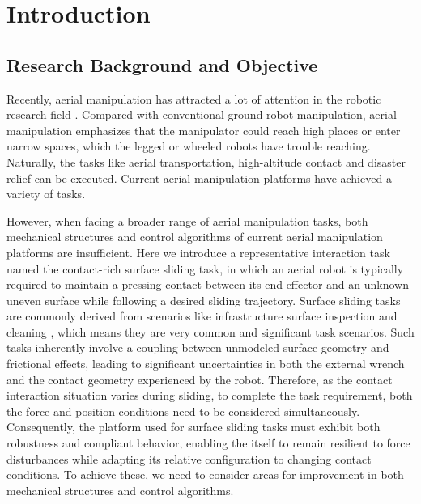 \chapter{Introduction}


\section{Research Background and Objective}
Recently, aerial manipulation has attracted a lot of attention in the robotic research field \cite{ollero_2021_past}. Compared with conventional ground robot manipulation, aerial manipulation emphasizes that the manipulator could reach high places or enter narrow spaces, which the legged or wheeled robots have trouble reaching. Naturally, the tasks like aerial transportation, high-altitude contact and disaster relief can be executed. Current aerial manipulation platforms have achieved a variety of tasks.

However, when facing a broader range of aerial manipulation tasks, both mechanical structures and control algorithms of current aerial manipulation platforms are insufficient. Here we introduce a representative interaction task named the contact-rich surface sliding task, in which an aerial robot is typically required to maintain a pressing contact between its end effector and an unknown uneven surface while following a desired sliding trajectory. Surface sliding tasks are commonly derived from scenarios like infrastructure surface inspection and cleaning \cite{bodie_2020_active, trujillo_2019_novel, tognon_2019_truly}, which means they are very common and significant task scenarios. Such tasks inherently involve a coupling between unmodeled surface geometry and frictional effects, leading to significant uncertainties in both the external wrench and the contact geometry experienced by the robot. Therefore, as the contact interaction situation varies during sliding, to complete the task requirement, both the force and position conditions need to be considered simultaneously. Consequently, the platform used for surface sliding tasks must exhibit both robustness and compliant behavior, enabling the itself to remain resilient to force disturbances while adapting its relative configuration to changing contact conditions. To achieve these, we need to consider areas for improvement in both mechanical structures and control algorithms.


